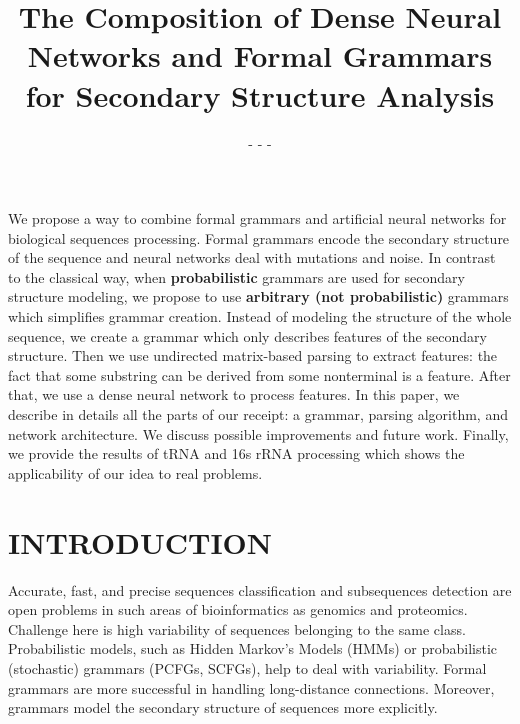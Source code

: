 \documentclass[a4paper,twoside]{article}
\begin{document}
\title{The Composition of Dense Neural Networks and Formal Grammars for Secondary Structure Analysis}

\author{ {- - -}%
\affiliation{- - -}%
\affiliation{- - -}%
\email{- - -}%
}


\abstract
{
We propose a way to combine formal grammars and artificial neural networks for biological sequences processing.
Formal grammars encode the secondary structure of the sequence and neural networks deal with mutations and noise.
In contrast to the classical way, when \textbf{probabilistic} grammars are used for secondary structure modeling, we propose to use \textbf{arbitrary (not probabilistic)} grammars which simplifies grammar creation.
Instead of modeling the structure of the whole sequence, we create a grammar which only describes features of the secondary structure.
Then we use undirected matrix-based parsing to extract features: the fact that some substring can be derived from some nonterminal is a feature. 
After that, we use a dense neural network to process features.
In this paper, we describe in details all the parts of our receipt: a grammar, parsing algorithm, and network architecture. We discuss possible improvements and future work.
Finally, we provide the results of tRNA and 16s rRNA processing which shows the applicability of our idea to real problems.
}

\onecolumn \maketitle \normalsize \vfill

\section{\uppercase{Introduction}}
\label{sec:introduction}

\noindent Accurate, fast, and precise sequences classification and subsequences detection are open problems in such areas of bioinformatics as genomics and proteomics. 
Challenge here is high variability of sequences belonging to the same class.
Probabilistic models, such as Hidden Markov's Models (HMMs) or probabilistic (stochastic) grammars (PCFGs, SCFGs), help to deal with variability.
Formal grammars are more successful in handling long-distance connections.
Moreover, grammars model the secondary structure of sequences more explicitly.
\end{document}
